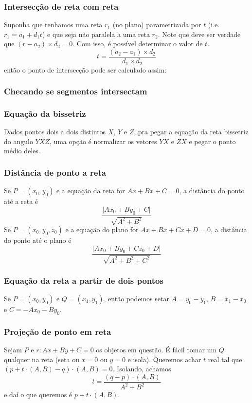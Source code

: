 \subsubsection{Intersecção de reta com reta}

Suponha que tenhamos uma reta $r_1$ (no plano) parametrizada por $t$ (i.e. 
$ r_1 = a_1 + d_1 t$) e que seja não paralela a uma reta $r_2$. Note que 
deve ser verdade que $(r-a_2) \times d_2 = 0$. Com isso, é possível determinar
o valor de $t$.
$$ t = \dfrac{(a_2 - a_1) \times d_2}{d_1 \times d_2}$$
então o ponto de intersecção pode ser calculado assim:

\subsubsection{Checando se segmentos intersectam}

\subsubsection{Equação da bissetriz}
Dados pontos dois a dois distintos $X$, $Y$ e $Z$, pra pegar a equação da reta
bissetriz do angulo $YXZ$, uma opção é normalizar os vetores $YX$ e $ZX$ e pegar
o ponto médio deles.

\subsubsection{Distância de ponto a reta}
Se $P = (x_0, y_0)$ e a equação da reta for $Ax + Bx + C = 0$, a distância do ponto
até a reta é
$$ \dfrac{\vert Ax_0 + By_0 + C\vert}{\sqrt{A^2 + B^2}}$$
Se $P = (x_0, y_0, z_0)$ e a equação do plano for $Ax + Bx + Cx + D = 0$, a distância
do ponto até o plano é
$$\dfrac{\vert Ax_0 + By_0 + Cz_0 + D \vert}{\sqrt{A^2 + B^2 + C^2}}$$

\subsubsection{Equação da reta a partir de dois pontos}
Se $P=(x_0, y_0)$ e $Q=(x_1, y_1)$, então podemos setar $A=y_0-y_1$, $B=x_1-x_0$ e 
$C=-Ax_0-By_0$.

\subsubsection{Projeção de ponto em reta}
Sejam $P$ e $r : Ax + By + C = 0$ os objetos em questão. É fácil tomar um $Q$
qualquer na reta (seta ou $x=0$ ou $y=0$ e isola). Queremos achar $t$ real tal
que $(p + t \cdot (A, B) - q) \cdot (A, B) = 0$. Isolando, achamos
$$ t = \dfrac{(q - p) \cdot (A, B)}{A^2+B^2}$$
e daí o que queremos é $p + t \cdot (A, B)$.

